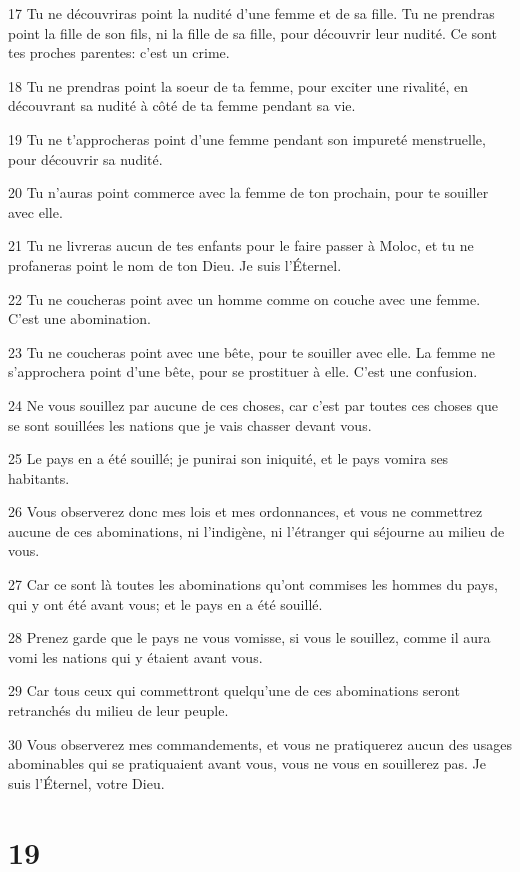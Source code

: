 \par 17 Tu ne découvriras point la nudité d'une femme et de sa fille. Tu ne prendras point la fille de son fils, ni la fille de sa fille, pour découvrir leur nudité. Ce sont tes proches parentes: c'est un crime.
\par 18 Tu ne prendras point la soeur de ta femme, pour exciter une rivalité, en découvrant sa nudité à côté de ta femme pendant sa vie.
\par 19 Tu ne t'approcheras point d'une femme pendant son impureté menstruelle, pour découvrir sa nudité.
\par 20 Tu n'auras point commerce avec la femme de ton prochain, pour te souiller avec elle.
\par 21 Tu ne livreras aucun de tes enfants pour le faire passer à Moloc, et tu ne profaneras point le nom de ton Dieu. Je suis l'Éternel.
\par 22 Tu ne coucheras point avec un homme comme on couche avec une femme. C'est une abomination.
\par 23 Tu ne coucheras point avec une bête, pour te souiller avec elle. La femme ne s'approchera point d'une bête, pour se prostituer à elle. C'est une confusion.
\par 24 Ne vous souillez par aucune de ces choses, car c'est par toutes ces choses que se sont souillées les nations que je vais chasser devant vous.
\par 25 Le pays en a été souillé; je punirai son iniquité, et le pays vomira ses habitants.
\par 26 Vous observerez donc mes lois et mes ordonnances, et vous ne commettrez aucune de ces abominations, ni l'indigène, ni l'étranger qui séjourne au milieu de vous.
\par 27 Car ce sont là toutes les abominations qu'ont commises les hommes du pays, qui y ont été avant vous; et le pays en a été souillé.
\par 28 Prenez garde que le pays ne vous vomisse, si vous le souillez, comme il aura vomi les nations qui y étaient avant vous.
\par 29 Car tous ceux qui commettront quelqu'une de ces abominations seront retranchés du milieu de leur peuple.
\par 30 Vous observerez mes commandements, et vous ne pratiquerez aucun des usages abominables qui se pratiquaient avant vous, vous ne vous en souillerez pas. Je suis l'Éternel, votre Dieu.

\chapter{19}

